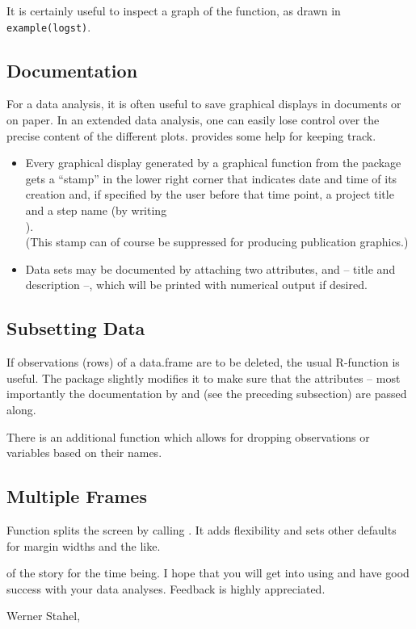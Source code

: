 \documentclass[11pt]{article}
\begin{document}
It is certainly useful to inspect a graph of the function, as drawn in 
\texttt{example(logst)}.


\subsection{Documentation}
For a data analysis, it is often useful to save graphical displays in 
documents or on paper. In an extended data analysis, one can easily lose
control over the precise content of the different plots.
 provides some help for keeping track.
\begin{itemize}
\item 
  Every graphical display generated by a graphical function from the
  package gets a ``stamp'' in the lower right corner that indicates date
  and time of its creation and, if specified by the user before that 
  time point, a project title and a step name (by writing\\
  ).\\
  (This stamp can of course be suppressed for producing publication
  graphics.) 
\item
  Data sets may be documented by attaching two attributes,  and 
   -- title and description --, which will be printed with
  numerical output if desired.
\end{itemize}

\subsection{Subsetting Data}
If observations (rows) of a data.frame are to be deleted, the usual
R-function  is useful. The package slightly modifies it to make
sure that the attributes -- most importantly the documentation by
 and  (see the preceding subsection) are passed along.

There is an additional function  which allows for dropping
observations or variables based on their names.

\subsection{Multiple Frames}
Function  splits the screen by calling .
It adds flexibility and sets other defaults for margin widths and the like. 
\\[10mm]

{\small
{} of the story for the time being. I hope that you will
get into using  and have good success with your data analyses.
Feedback is highly appreciated.

Werner Stahel, 
}
\end{document}
